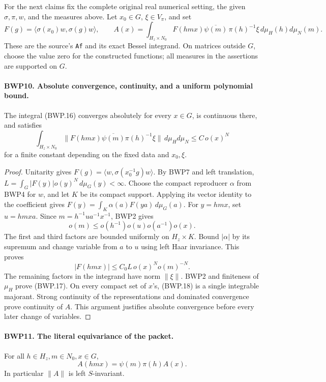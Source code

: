 \documentclass[11pt,a4paper]{article}
\numberwithin{equation}{section}
\theoremstyle{remark}\newtheorem{remark}[theorem]{Remark}
\begin{document}
For the next claims fix the complete original real numerical setting,
the given \(\sigma,\pi,w\), and the measures above.  Let
\(x_0\in G\), \(\xi\in V_\pi\), and set
\[
 F(g)=\langle\sigma(x_0)w,\sigma(g)w\rangle,\qquad
 A(x)=\int_{H_z\times N_0}
 F(hmx)\overline{\psi(m)}\,\pi(h)^{-1}\xi\,d\mu_H(h)d\mu_N(m).
 \tag{BWP.16}
\]
These are the source's \texttt{Af} and its exact Bessel integrand.
On matrices outside \(G\), choose the value zero for the constructed
functions; all measures in the assertions are supported on \(G\).

\paragraph{BWP10. Absolute convergence, continuity, and a uniform polynomial bound.}
\label{claim:BWP10}
The integral (BWP.16) converges absolutely for every \(x\in G\),
is continuous there, and satisfies
\[
 \int_{H_z\times N_0}\|F(hmx)\overline{\psi(m)}\pi(h)^{-1}\xi\|
 \,d\mu_Hd\mu_N\le C\,o(x)^N
 \tag{BWP.17}
\]
for a finite constant depending on the fixed data and \(x_0,\xi\).

\begin{proof}
Unitarity gives \(F(g)=\langle w,\sigma(x_0^{-1}g)w\rangle\).
By BWP7 and left translation,
\(L=\int_G|F(y)|o(y)^N\,d\mu_G(y)<\infty\).
Choose the compact reproducer \(\alpha\) from BWP4 for \(w\),
and let \(K\) be its compact support.  Applying its vector identity
to the coefficient gives
\(F(y)=\int_K\alpha(a)F(ya)\,d\mu_G(a)\).
For \(y=hmx\), set \(u=hmxa\).  Since
\(m=h^{-1}ua^{-1}x^{-1}\), BWP2 gives
\[
 o(m)\le o(h^{-1})o(u)o(a^{-1})o(x).
\]
The first and third factors are bounded uniformly on \(H_z\times K\).
Bound \(|\alpha|\) by its supremum and change variable from
\(a\) to \(u\) using left Haar invariance.  This proves
\[
 |F(hmx)|\le C_0L\,o(x)^N o(m)^{-N}.
 \tag{BWP.18}
\]
The remaining factors in the integrand have norm \(\|\xi\|\).
BWP2 and finiteness of \(\mu_H\) prove (BWP.17).
On every compact set of \(x\)'s, (BWP.18) is a single integrable
majorant.  Strong continuity of the representations and dominated
convergence prove continuity of \(A\).  This argument justifies
absolute convergence before every later change of variables.
\end{proof}

\paragraph{BWP11. The literal equivariance of the packet.}
\label{claim:BWP11}
For all \(h\in H_z,m\in N_0,x\in G\),
\[
 A(hmx)=\psi(m)\pi(h)A(x).
 \tag{BWP.19}
\]
In particular \(\|A\|\) is left \(S\)-invariant.
\end{document}
